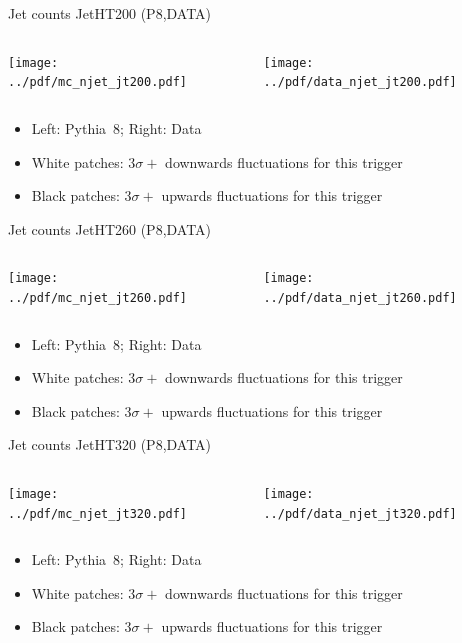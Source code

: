 \documentclass[9pt]{beamer}
\begin{document}
\begin{frame}[t]{Jet counts JetHT200 (P8,DATA)}
\begin{columns}[T]
  \begin{column}{.5\textwidth}
  \texttt{[image: ../pdf/mc\_njet\_jt200.pdf]}
  \end{column}
  \begin{column}{.5\textwidth}
  \texttt{[image: ../pdf/data\_njet\_jt200.pdf]}
  \end{column}
\end{columns}
\begin{itemize}
 \item Left: Pythia~8; Right: Data
 \item White patches: $3\sigma+$ downwards fluctuations for this trigger
 \item Black patches: $3\sigma+$ upwards fluctuations for this trigger
\end{itemize}
\end{frame}

\begin{frame}[t]{Jet counts JetHT260 (P8,DATA)}
\begin{columns}[T]
  \begin{column}{.5\textwidth}
  \texttt{[image: ../pdf/mc\_njet\_jt260.pdf]}
  \end{column}
  \begin{column}{.5\textwidth}
  \texttt{[image: ../pdf/data\_njet\_jt260.pdf]}
  \end{column}
\end{columns}
\begin{itemize}
 \item Left: Pythia~8; Right: Data
 \item White patches: $3\sigma+$ downwards fluctuations for this trigger
 \item Black patches: $3\sigma+$ upwards fluctuations for this trigger
\end{itemize}
\end{frame}

\begin{frame}[t]{Jet counts JetHT320 (P8,DATA)}
\begin{columns}[T]
  \begin{column}{.5\textwidth}
  \texttt{[image: ../pdf/mc\_njet\_jt320.pdf]}
  \end{column}
  \begin{column}{.5\textwidth}
  \texttt{[image: ../pdf/data\_njet\_jt320.pdf]}
  \end{column}
\end{columns}
\begin{itemize}
 \item Left: Pythia~8; Right: Data
 \item White patches: $3\sigma+$ downwards fluctuations for this trigger
 \item Black patches: $3\sigma+$ upwards fluctuations for this trigger
\end{itemize}
\end{frame}
\end{document}
